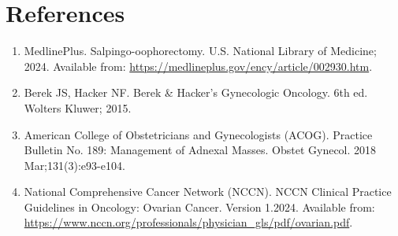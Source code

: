 \section*{References}
\begin{enumerate}
  \item MedlinePlus. Salpingo-oophorectomy. U.S. National Library of Medicine; 2024. Available from: \url{https://medlineplus.gov/ency/article/002930.htm}.
  
  \item Berek JS, Hacker NF. Berek \& Hacker's Gynecologic Oncology. 6th ed. Wolters Kluwer; 2015.
  
  \item American College of Obstetricians and Gynecologists (ACOG). Practice Bulletin No. 189: Management of Adnexal Masses. Obstet Gynecol. 2018 Mar;131(3):e93-e104.
  
  \item National Comprehensive Cancer Network (NCCN). NCCN Clinical Practice Guidelines in Oncology: Ovarian Cancer. Version 1.2024. Available from: \url{https://www.nccn.org/professionals/physician_gls/pdf/ovarian.pdf}.
\end{enumerate}

\clearpage
